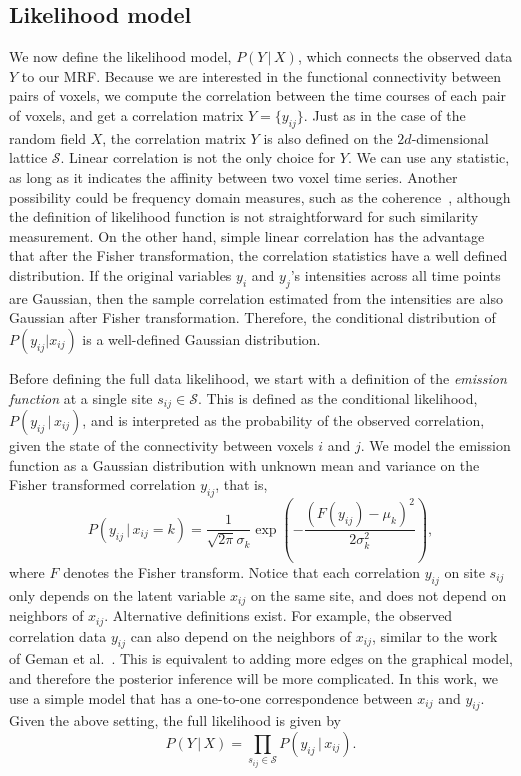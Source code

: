 \subsection{Likelihood model}
We now define the likelihood model, $P(Y \, | \, X)$, which connects the
observed data $Y$ to our MRF. Because we are interested in the functional
connectivity between pairs of voxels, we compute the correlation between the
time courses of each pair of voxels, and get a correlation matrix $Y =
\{y_{ij}\}$. Just as in the case of the random field $X$, the correlation matrix
$Y$ is also defined on the $2d$-dimensional lattice $\mathcal{S}$. Linear
correlation is not the only choice for $Y$. We can use any statistic, as long as
it indicates the affinity between two voxel time series. Another possibility
could be frequency domain measures, such as the
coherence~\cite{mller_multivariate_2001}, although the definition of likelihood
function is not straightforward for such similarity measurement. On the other
hand, simple linear correlation has the advantage that after the Fisher
transformation, the correlation statistics have a well defined distribution. If
the original variables $y_i$ and $y_j$'s intensities across all time points are
Gaussian, then the sample correlation estimated from the intensities are also
Gaussian after Fisher transformation. Therefore, the conditional distribution of
$P(y_{ij} | x_{ij})$ is a well-defined Gaussian distribution.

Before defining the full data likelihood, we start with a definition of the {\em
  emission function} at a single site $s_{ij} \in \mathcal{S}$. This is defined
as the conditional likelihood, $P(y_{ij} \, | \, x_{ij})$, and is interpreted as
the probability of the observed correlation, given the state of the connectivity
between voxels $i$ and $j$. We model the emission function as a Gaussian
distribution with unknown mean and variance on the Fisher transformed
correlation $y_{ij}$, that is,
\begin{equation}
\label{eq:emission}
P(y_{ij} \,|\, x_{ij} = k) = \frac{1}{\sqrt{2\pi} \sigma_k} \exp \left( -\frac{(F(y_{ij}) -  \mu_k)^2}{2\sigma_k^2}\right),
\end{equation}
where $F$ denotes the Fisher transform. Notice that each correlation $y_{ij}$ on
site $s_{ij}$ only depends on the latent variable $x_{ij}$ on the same site, and
does not depend on neighbors of $x_{ij}$. Alternative definitions exist. For
example, the observed correlation data $y_{ij}$ can also depend on the
neighbors of $x_{ij}$, similar to the work of Geman et
al.~\cite{geman1984stochastic}. This is equivalent to adding more edges on the
graphical model, and therefore the posterior inference will be more
complicated. In this work, we use a simple model that has a one-to-one
correspondence between $x_{ij}$ and $y_{ij}$. Given the above setting, the full
likelihood is given by
\begin{equation}
\label{eq:likelihood}
P(Y \, | \, X) = \prod_{s_{ij}\in\mathcal{S}} P(y_{ij} \, | \, x_{ij}).
\end{equation}

